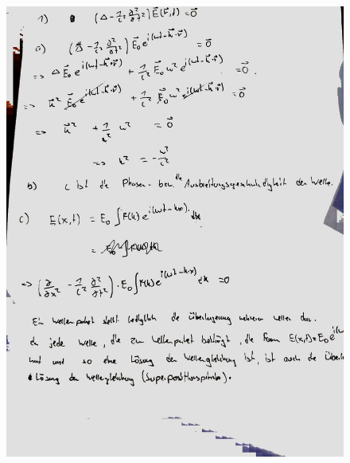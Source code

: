 \documentclass[11pt a4paper]{article}
\begin{document}
\thispagestyle{fancy}

\begin{figure}[H]
	\centering
	\includegraphics[width=15cm]{roman/1abc.jpg}
\end{figure}

\newpage
\setlength{\headheight}{0cm}
\end{document}
